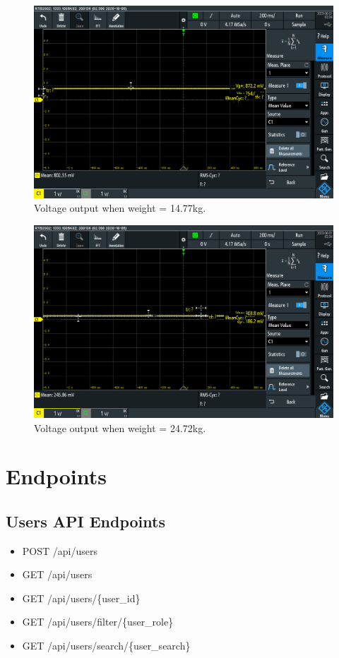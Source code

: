 \begin{figure}[h]
\centering
\includegraphics[width=\textwidth]{final-report/assets/15kg_exp.png}
\caption{Voltage output when weight = 14.77kg.}
\end{figure}

\begin{figure}[h]
\centering
\includegraphics[width=\textwidth]{final-report/assets/25kg_exp.png}
\caption{Voltage output when weight = 24.72kg.}
\end{figure}


\chapter{Endpoints}
\section{Users API Endpoints}
\begin{itemize}
    \item POST /api/users
    \item GET /api/users
    \item GET /api/users/\{user\_id\}
    \item GET /api/users/filter/\{user\_role\}
    \item GET /api/users/search/\{user\_search\}
\end{itemize}

